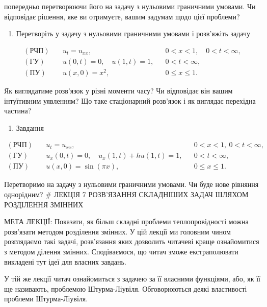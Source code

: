 \documentclass[
  ukrainian,
]{article}
\providecommand{\tightlist}{%
  \setlength{\itemsep}{0pt}\setlength{\parskip}{0pt}}
\begin{document}
попередньо перетворюючи його на задачу з нульовими граничними умовами.
Чи відповідає рішення, яке ви отримуєте, вашим задумам щодо цієї
проблеми?

\begin{enumerate}
\def\labelenumi{\arabic{enumi}.}
\setcounter{enumi}{1}
\tightlist
\item
  Перетворіть у задачу з нульовими граничними умовами і розв'яжіть
  задачу
\end{enumerate}

\[
\begin{aligned}
(\text{РЧП})\quad & u_t = u_{xx}, && 0 < x < 1,\quad 0 < t < \infty, \\
(\text{ГУ})\quad & u(0,t)=0,\quad u(1,t)=1, && 0 < t < \infty, \\
(\text{ПУ})\quad & u(x,0)=x^2, && 0 \le x \le 1.
\end{aligned}
\]

Як виглядатиме розв'язок у різні моменти часу? Чи відповідає він вашим
інтуїтивним уявленням? Що таке стаціонарний розв'язок і як виглядає
перехідна частина?

\begin{enumerate}
\def\labelenumi{\arabic{enumi}.}
\setcounter{enumi}{2}
\tightlist
\item
  Завдання
\end{enumerate}

\[
\begin{aligned}
(\text{РЧП})\quad & u_t = u_{xx}, && 0 < x < 1,\ 0 < t < \infty, \\
(\text{ГУ})\quad & u_x(0,t) = 0,\quad u_x(1,t) + h u(1,t) = 1, && 0 < t < \infty, \\
(\text{ПУ})\quad & u(x,0) = \sin(\pi x), && 0 \leqslant x \leqslant 1.
\end{aligned}
\]

Перетворимо на задачу з нульовими граничними умовами. Чи буде нове
рівняння однорідним? \# ЛЕКЦІЯ 7 РОЗВ'ЯЗАННЯ СКЛАДНІШИХ ЗАДАЧ ШЛЯХОМ
РОЗДІЛЕННЯ ЗМІННИХ

МЕТА ЛЕКЦІЇ: Показати, як більш складні проблеми теплопровідності можна
розв'язати методом розділення змінних. У цій лекції ми головним чином
розглядаємо такі задачі, розв'язання яких дозволить читачеві краще
ознайомитися з методом ділення змінних. Сподіваємося, що читач зможе
екстраполювати викладені тут ідеї для власних завдань.

У тій же лекції читач ознайомиться з задачею за її власними функціями,
або, як її ще називають, проблемою Штурма-Ліувіля. Обговорюються деякі
властивості проблеми Штурма-Ліувіля.
\end{document}
